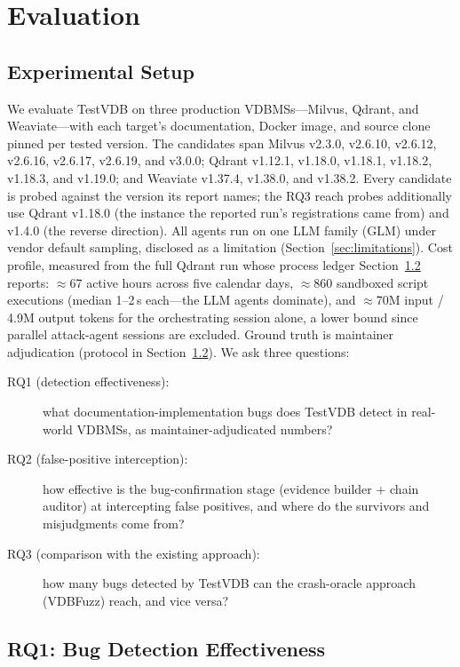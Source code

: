\documentclass[acmsmall,screen,review,anonymous]{acmart}
\newcommand{\system}{TestVDB}
\begin{document}
\section{Evaluation}
\label{sec:eval}

\subsection{Experimental Setup}
\label{subsec:setup}

We evaluate \system{} on three production VDBMSs---Milvus, Qdrant, and Weaviate---with each target's documentation, Docker image, and source clone pinned per tested version. The candidates span Milvus v2.3.0, v2.6.10, v2.6.12, v2.6.16, v2.6.17, v2.6.19, and v3.0.0; Qdrant v1.12.1, v1.18.0, v1.18.1, v1.18.2, v1.18.3, and v1.19.0; and Weaviate v1.37.4, v1.38.0, and v1.38.2. Every candidate is probed against the version its report names; the RQ3 reach probes additionally use Qdrant v1.18.0 (the instance the reported run's registrations came from) and v1.4.0 (the reverse direction). All agents run on one LLM family (GLM) under vendor default sampling, disclosed as a limitation (Section~\ref{sec:limitations}). Cost profile, measured from the full Qdrant run whose process ledger Section~\ref{subsec:rq1} reports: $\approx$67 active hours across five calendar days, $\approx$860 sandboxed script executions (median 1--2\,s each---the LLM agents dominate), and $\approx$70M input / 4.9M output tokens for the orchestrating session alone, a lower bound since parallel attack-agent sessions are excluded. Ground truth is maintainer adjudication (protocol in Section~\ref{subsec:rq1}). We ask three questions:
\begin{description}
  \item[RQ1 (detection effectiveness):] what documentation-implementation bugs does \system{} detect in real-world VDBMSs, as maintainer-adjudicated numbers?
  \item[RQ2 (false-positive interception):] how effective is the bug-confirmation stage (evidence builder + chain auditor) at intercepting false positives, and where do the survivors and misjudgments come from?
  \item[RQ3 (comparison with the existing approach):] how many bugs detected by \system{} can the crash-oracle approach (VDBFuzz) reach, and vice versa?
\end{description}

\subsection{RQ1: Bug Detection Effectiveness}
\label{subsec:rq1}
\end{document}
